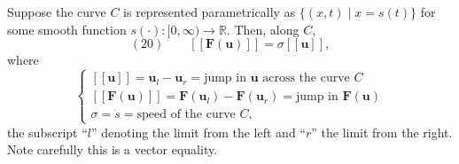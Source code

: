 \begin{figure}[h]\centering
\end{figure}

\begin{proposition}
\label{prop:rankine-hugoniot-condition-system}
Suppose the curve $C$ is represented parametrically as $\{(x,t)\mid x = s(t)\}$ for some smooth function $s(\cdot):[0,\infty)\to\mathbb{R}$. Then, along $C$,
$$(20) \qquad [\![\mathbf{F}(\mathbf{u})]\!] = \sigma[\![\mathbf{u}]\!],$$
where
$$\begin{cases}
[\![\mathbf{u}]\!] = \mathbf{u}_l - \mathbf{u}_r = \text{jump in } \mathbf{u} \text{ across the curve } C \\
[\![\mathbf{F}(\mathbf{u})]\!] = \mathbf{F}(\mathbf{u}_l) - \mathbf{F}(\mathbf{u}_r) = \text{jump in } \mathbf{F}(\mathbf{u}) \\
\sigma = \dot{s} = \text{speed of the curve } C,
\end{cases}$$
the subscript ``$l$'' denoting the limit from the left and ``$r$'' the limit from the right. Note carefully this is a vector equality.
\end{proposition}

